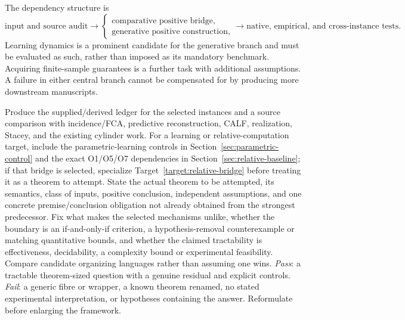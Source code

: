 \documentclass[11pt]{article}
\theoremstyle{remark}
\begin{document}
The dependency structure is
\[
 \text{input and source audit}
 \longrightarrow
 \begin{cases}
 \text{comparative positive bridge},\\
 \text{generative positive construction},
 \end{cases}
 \longrightarrow
 \text{native, empirical, and cross-instance tests}.
\]
Learning dynamics is a prominent candidate for the generative branch and must be evaluated as such, rather than imposed as its mandatory benchmark. Acquiring finite-sample guarantees is a further task with additional assumptions. A failure in either central branch cannot be compensated for by producing more downstream manuscripts.

\begin{description}[style=nextline,leftmargin=0pt]
\item[Gate A \quad State the first research problem]
Produce the supplied/derived ledger for the selected instances and a source comparison with incidence/FCA, predictive reconstruction, CALF, realization, Stacey, and the existing cylinder work. For a learning or relative-computation target, include the parametric-learning controls in Section~\ref{sec:parametric-control} and the exact O1/O5/O7 dependencies in Section~\ref{sec:relative-baseline}; if that bridge is selected, specialize Target~\ref{target:relative-bridge} before treating it as a theorem to attempt. State the actual theorem to be attempted, its semantics, class of inputs, positive conclusion, independent assumptions, and one concrete premise/conclusion obligation not already obtained from the strongest predecessor. Fix what makes the selected mechanisms unlike, whether the boundary is an if-and-only-if criterion, a hypothesis-removal counterexample or matching quantitative bounds, and whether the claimed tractability is effectiveness, decidability, a complexity bound or experimental feasibility. Compare candidate organizing languages rather than assuming one wins. \emph{Pass}: a tractable theorem-sized question with a genuine residual and explicit controls. \emph{Fail}: a generic fibre or wrapper, a known theorem renamed, no stated experimental interpretation, or hypotheses containing the answer. Reformulate before enlarging the framework.


\end{description}
\end{document}
